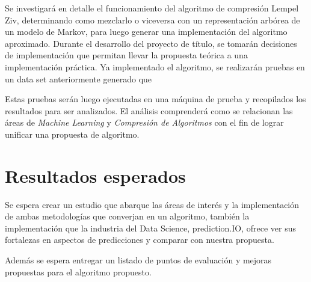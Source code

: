\documentclass{udparticle}
\begin{document}
Se investigará en detalle el funcionamiento del algoritmo de compresión Lempel Ziv, determinando como mezclarlo o viceversa con un representación arbórea de un modelo de Markov, para luego generar una implementación del algoritmo aproximado.
Durante el desarrollo del proyecto de título, se tomarán decisiones de implementación que permitan llevar la propuesta teórica a una implementación práctica. Ya implementado el algoritmo, se realizarán pruebas en un data set anteriormente generado que 

Estas pruebas serán luego ejecutadas en una máquina de prueba y recopilados los resultados para ser analizados.
El análisis comprenderá como se relacionan las áreas de \emph{Machine Learning} y \emph{Compresión de Algoritmos} con el fin de lograr unificar una propuesta de algoritmo. 

\section{Resultados esperados}

Se espera crear un estudio que abarque las áreas de interés y la implementación de ambas metodologías que converjan en un algoritmo, 
también la implementación que la industria del Data Science, prediction.IO, ofrece ver sus fortalezas en aspectos de predicciones y comparar con nuestra propuesta.

Además se espera entregar un listado de puntos de evaluación y mejoras propuestas para el algoritmo propuesto.

\newpage
\end{document}

